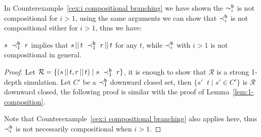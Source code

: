 \documentclass{LMCS}
\DeclareMathOperator{\interleave}{||}
\newcommand{\iBSB}[1]{\sim_{#1}^{{\sf b}}}
\newcommand{\iBSi}[1]{\prec_{#1}^{{\sf b}}}
\newcommand{\PAR}[2]{#1\interleave#2}
\newcommand{\MC}[1]{\mathcal{#1}}
\begin{document}
In Counterexample~\ref{cex:i compositional branching} we have shown
the $\iBSB{i}$ is not compositional for $i>1$, using the same
arguments we can show that $\iBSi{i}$ is not compositional either for
$i>1$, thus we have:
\begin{lem}\label{lemma:i compositional branching simulation}
$s~\iBSi{1}~r$ implies that $\PAR{s}{t}~\iBSi{1}~\PAR{r}{t}$ for any $t$, while $\iBSi{i}$ with $i>1$ is not compositional in general.
\end{lem}
\begin{proof}
Let $\MC{R}=\{(\PAR{s}{t},\PAR{r}{t})\mid s~\iBSi{1}~r\}$, it is enough to show that $\MC{R}$ is a strong 1-depth simulation.
Let $C'$ be a $\iBSi{1}$ downward closed set, then $\{\PAR{s'}{t}\mid s'\in C'\}$ is $\MC{R}$ downward closed, the following
proof is similar with the proof of Lemma~\ref{lem:1-composition}.


Note that Counterexample~\ref{cex:i compositional branching} also applies here, thus $\iBSi{i}$ is not necessarily compositional when $i>1$.
\end{proof}
\end{document}
